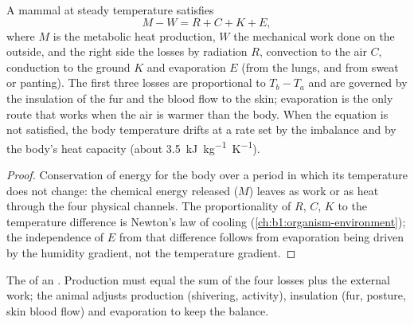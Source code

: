 \begin{proposition}\label{prop:b1:mammal-organization:heatbudget}
A mammal at steady temperature satisfies
\[
M - W = R + C + K + E ,
\]
where $M$ is the metabolic heat production, $W$ the mechanical work done
on the outside, and the right side the losses by radiation $R$,
convection to the air $C$, conduction to the ground $K$ and evaporation
$E$ (from the lungs, and from sweat or panting). The first three losses
are proportional to $T_b - T_a$ and are governed by the insulation of
the fur and the blood flow to the skin; evaporation is the only route
that works when the air is warmer than the body. When the equation is
not satisfied, the body temperature drifts at a rate set by the
imbalance and by the body's heat capacity (about
\qty{3.5}{kJ.kg^{-1}.K^{-1}}).
\end{proposition}
\begin{proof}
Conservation of energy for the body over a period in which its
temperature does not change: the chemical energy released ($M$) leaves
as work or as heat through the four physical channels. The
proportionality of $R$, $C$, $K$ to the temperature difference is
Newton's law of cooling (\cref{ch:b1:organism-environment}); the
independence of $E$ from that difference follows from evaporation being
driven by the humidity gradient, not the temperature gradient.
\end{proof}

\begin{omfigure}

{\small The  of an . Production must equal the sum
of the four losses plus the external work; the animal adjusts production
(shivering, activity), insulation (fur, posture, skin blood flow) and
evaporation to keep the balance.}
\end{omfigure}

